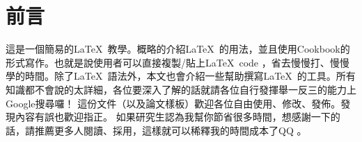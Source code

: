 \documentclass[class=NCU_thesis, crop=false, float=true]{standalone}
\begin{document}

\chapter{前言}
這是一個簡易的\LaTeX\ 教學。概略的介紹\LaTeX\ 的用法，並且使用Cookbook的形式寫作。也就是說使用者可以直接複製/貼上\LaTeX\ code ，省去慢慢打、慢慢學的時間。除了\LaTeX\ 語法外，本文也會介紹一些幫助撰寫\LaTeX\ 的工具。所有知識都不會說的太詳細，各位要深入了解的話就請各位自行發揮舉一反三的能力上Google搜尋囉！
這份文件（以及論文樣板）歡迎各位自由使用、修改、發佈。發現內容有誤也歡迎指正。
如果研究生認為我幫你節省很多時間，想感謝一下的話，請推薦更多人閱讀、採用，這樣就可以稀釋我的時間成本了QQ 。
\end{document}
